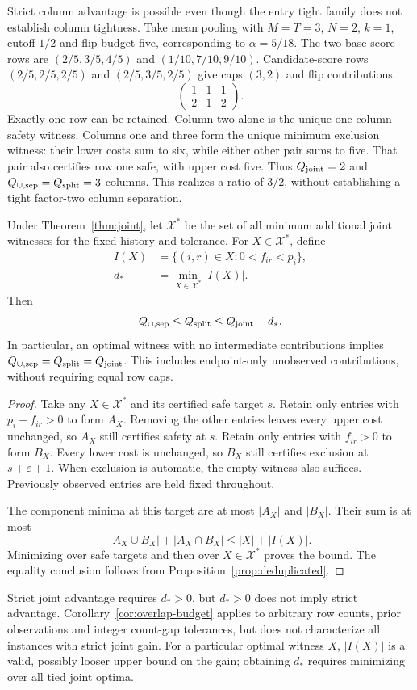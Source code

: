 Strict column advantage is possible even though the entry tight family does not establish column tightness. Take mean pooling with $M=T=3$, $N=2$, $k=1$, cutoff $1/2$ and flip budget five, corresponding to $\alpha=5/18$. The two base-score rows are $(2/5,3/5,4/5)$ and $(1/10,7/10,9/10)$. Candidate-score rows $(2/5,2/5,2/5)$ and $(2/5,3/5,2/5)$ give caps $(3,2)$ and flip contributions
\[
 \begin{pmatrix}1&1&1\\2&1&2\end{pmatrix}.
\]
Exactly one row can be retained. Column two alone is the unique one-column safety witness. Columns one and three form the unique minimum exclusion witness: their lower costs sum to six, while either other pair sums to five. That pair also certifies row one safe, with upper cost five. Thus $Q_{\rm joint}=2$ and $Q_{\cup,\rm sep}=Q_{\rm split}=3$ columns. This realizes a ratio of $3/2$, without establishing a tight factor-two column separation.


\begin{corollary}
\label{cor:overlap-budget}
Under Theorem~\ref{thm:joint}, let $\mathcal X^*$ be the set of all minimum additional joint witnesses for the fixed history and tolerance. For $X\in\mathcal X^*$, define
\[
 \begin{aligned}
 I(X)&=\{(i,r)\in X:0<f_{ir}<p_i\},\\
 d_*&=\min_{X\in\mathcal X^*}|I(X)|.
 \end{aligned}
\]
Then
\[
 Q_{\cup,\rm sep}\le Q_{\rm split}\le Q_{\rm joint}+d_*.
\]
In particular, an optimal witness with no intermediate contributions implies $Q_{\cup,\rm sep}=Q_{\rm split}=Q_{\rm joint}$. This includes endpoint-only unobserved contributions, without requiring equal row caps.
\end{corollary}
\begin{proof}
Take any $X\in\mathcal X^*$ and its certified safe target $s$. Retain only entries with $p_i-f_{ir}>0$ to form $A_X$. Removing the other entries leaves every upper cost unchanged, so $A_X$ still certifies safety at $s$. Retain only entries with $f_{ir}>0$ to form $B_X$. Every lower cost is unchanged, so $B_X$ still certifies exclusion at $s+\varepsilon+1$. When exclusion is automatic, the empty witness also suffices. Previously observed entries are held fixed throughout.

The component minima at this target are at most $|A_X|$ and $|B_X|$. Their sum is at most
\[
 |A_X\cup B_X|+|A_X\cap B_X|
 \le |X|+|I(X)|.
\]
Minimizing over safe targets and then over $X\in\mathcal X^*$ proves the bound. The equality conclusion follows from Proposition~\ref{prop:deduplicated}.
\end{proof}
Strict joint advantage requires $d_*>0$, but $d_*>0$ does not imply strict advantage. Corollary~\ref{cor:overlap-budget} applies to arbitrary row counts, prior observations and integer count-gap tolerances, but does not characterize all instances with strict joint gain. For a particular optimal witness $X$, $|I(X)|$ is a valid, possibly looser upper bound on the gain; obtaining $d_*$ requires minimizing over all tied joint optima.


